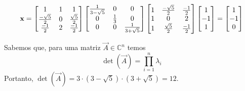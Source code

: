 \documentclass{homework}
\begin{document}
\begin{enumerate}[wide, leftmargin=80pt]
			\begin{align*}
				\vec{x} = \left[\begin{array}{@{}ccc@{}}
				1 & 1 & 1 \\
				\frac{-\sqrt{5}}{2} & 0 & \frac{\sqrt{5}}{2}\\
				\frac{-1}{2} & 2 & \frac{-1}{2}
				\end{array}\right]
				\left[\begin{array}{@{}ccc@{}}
				\frac{1}{3 - \sqrt{5}} & 0 & 0 \\
				0 & \frac{1}{3} & 0\\
				0 & 0 & \frac{1}{3 + \sqrt{5}}
				\end{array}\right]
				\left[\begin{array}{@{}ccc@{}}
				1 & \frac{-\sqrt{5}}{2} & \frac{-1}{2} \\
				1 & 0 & 2\\
				1 & \frac{\sqrt{5}}{2} & \frac{-1}{2}
				\end{array}\right]
				\left[\begin{array}{@{}c@{}}
				1 \\
				-1 \\
				1 
				\end{array}\right] = \left[\begin{array}{@{}c@{}}
				1 \\
				-1 \\
				0 
				\end{array}\right] 
			\end{align*}
		\end{enumerate}
		
		\subsubquest Sabemos que, para uma matriz $\vec{A} \in \mathbb{C}^n$ temos $$\det\left(\vec{A}\right) = \prod_{i=1}^{n} \lambda_i$$
		Portanto, $\det\left(\vec{A}\right) = 3 \cdot (3 - \sqrt{5}) \cdot (3 + \sqrt{5}) = 12$.
	
	\quest%
	
\end{document}
